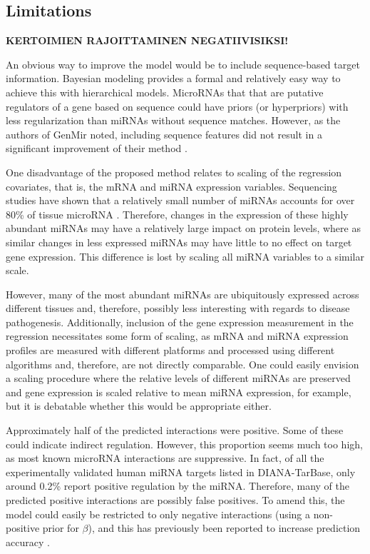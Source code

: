 \subsection*{Limitations}

\textbf{KERTOIMIEN RAJOITTAMINEN NEGATIIVISIKSI!}

An obvious way to improve the model would be to include sequence-based target
information. Bayesian modeling provides a formal and relatively easy way to
achieve this with hierarchical models. MicroRNAs that that are putative
regulators of a gene based on sequence could have priors (or hyperpriors) with
less regularization than miRNAs without sequence matches. However, as
the authors of GenMir noted, including sequence features did not result
in a significant improvement of their method \citep{Huang2007}.

One disadvantage of the proposed method relates to scaling of the regression
covariates, that is, the mRNA and miRNA expression variables. Sequencing studies have shown
that a relatively small number of miRNAs accounts for over 80\% of tissue microRNA
\citep{Landgraf2007}. Therefore, changes in the expression of these highly
abundant miRNAs may have a relatively large impact on protein levels, where as
similar changes in less expressed miRNAs may have little to no effect on target gene
expression. This difference is lost by scaling all miRNA variables to a similar scale.

However, many of the most abundant miRNAs are ubiquitously expressed across
different tissues \citep{Landgraf2007} and, therefore, possibly less
interesting with regards to disease pathogenesis. Additionally, inclusion of
the gene expression measurement in the regression necessitates some form of
scaling, as mRNA and miRNA expression profiles are measured with different platforms
and processed using different algorithms and, therefore, are not directly
comparable. One could easily envision a scaling procedure where the relative
levels of different miRNAs are preserved and gene expression is scaled
relative to mean miRNA expression, for example, but it is debatable whether
this would be appropriate either.

Approximately half of the predicted interactions were positive. Some of these
could indicate indirect regulation. However, this proportion seems much too
high, as most known microRNA interactions are suppressive. In fact, of all the
experimentally validated human miRNA targets listed in DIANA-TarBase, only
around 0.2\% report positive regulation by the miRNA. Therefore, many of the
predicted positive interactions are possibly false positives. To amend this,
the model could easily be restricted to only negative interactions (using a
non-positive prior for $\beta$), and this has previously been reported to
increase prediction accuracy \citep{Muniategui2013}.

